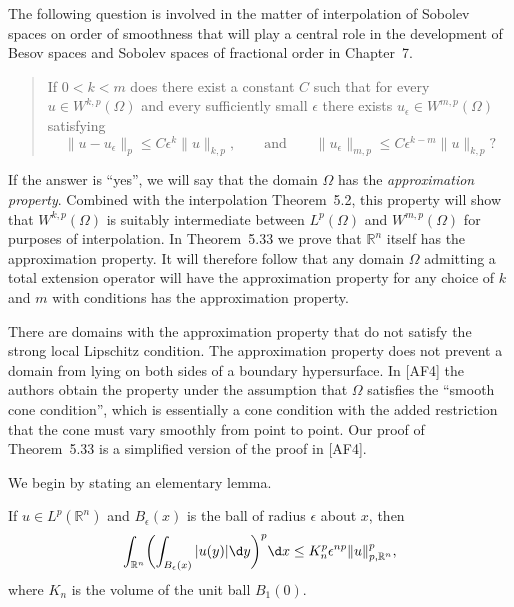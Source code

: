 \begin{para}
  The following question is involved in the matter of interpolation of
  Sobolev spaces on order of smoothness that will play a central role
  in the development of Besov spaces and Sobolev spaces of fractional
  order in Chapter~7.

  \begin{quotation}
    If $0<k<m$ does there exist a constant $C$ such that for every
    $u\in W^{k,p}(\Omega)$ and every sufficiently small $\epsilon$
    there exists $u_{\epsilon}\in W^{m,p}(\Omega)$ satisfying
    \[ \|u-u_{\epsilon}\|_p \leq C\epsilon^k \|u\|_{k,p},
        \qquad \text{and} \qquad
        \|u_{\epsilon}\|_{m,p} \leq C\epsilon^{k-m} \|u\|_{k,p}? \]
  \end{quotation}
  If the answer is ``yes'', we will say that the domain $\Omega$
  has the \emph{approximation property}. Combined with the interpolation
  Theorem~5.2, this property will show that $W^{k,p}(\Omega)$ is suitably
  intermediate between $L^p(\Omega)$ and $W^{m,p}(\Omega)$ for purposes
  of interpolation. In Theorem~5.33 we prove that $\mathbb{R}^n$ itself
  has the approximation property. It will therefore follow that any
  domain $\Omega$ admitting a total extension operator will have the
  approximation property for any choice of $k$ and $m$ with conditions
  has the approximation property.

  There are domains with the approximation property that do not satisfy
  the strong local Lipschitz condition. The approximation property does
  not prevent a domain from lying on both sides of a boundary hypersurface.
  In [AF4] the authors obtain the property under the assumption that
  $\Omega$ satisfies the ``smooth cone condition'', which is essentially
  a cone condition with the added restriction that the cone must
  vary smoothly from point to point. Our proof of Theorem~5.33 is a
  simplified version of the proof in [AF4].

  We begin by stating an elementary lemma.
\end{para}


\begin{lemma}
  If $u\in L^p(\mathbb{R}^n)$ and $B_{\epsilon}(x)$ is the ball
  of radius $\epsilon$ about $x$, then
  \[ \int_{\mathbb{R}^n} \biggl(\int_{B_{\epsilon}(x)} |u(y)| \d y\biggr)^p \d x
      \leq K_n^p \epsilon^{np} \|u\|_{p,\mathbb{R}^n}^p, \]
  where $K_n$ is the volume of the unit ball $B_1(0)$.
\end{lemma}

